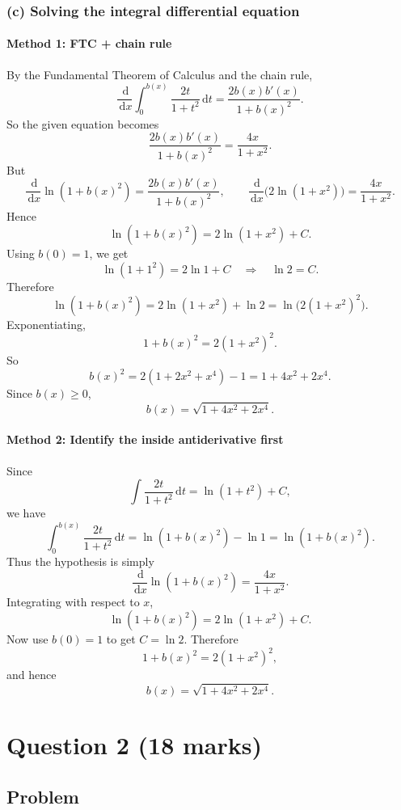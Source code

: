 \documentclass[12pt]{article}
\newcommand{\dd}{\,\mathrm{d}}
\begin{document}
\bigskip

\subsubsection{(c) Solving the integral differential equation}

\paragraph{Method 1: FTC + chain rule}
By the Fundamental Theorem of Calculus and the chain rule,
\[
\frac{\dd}{\dd x}\int_0^{b(x)}\frac{2t}{1+t^2}\dd t
=
\frac{2b(x)b'(x)}{1+b(x)^2}.
\]
So the given equation becomes
\[
\frac{2b(x)b'(x)}{1+b(x)^2}=\frac{4x}{1+x^2}.
\]
But
\[
\frac{\dd}{\dd x}\ln(1+b(x)^2)=\frac{2b(x)b'(x)}{1+b(x)^2},
\qquad
\frac{\dd}{\dd x}\bigl(2\ln(1+x^2)\bigr)=\frac{4x}{1+x^2}.
\]
Hence
\[
\ln(1+b(x)^2)=2\ln(1+x^2)+C.
\]
Using \(b(0)=1\), we get
\[
\ln(1+1^2)=2\ln 1+C \quad\Rightarrow\quad \ln 2=C.
\]
Therefore
\[
\ln(1+b(x)^2)=2\ln(1+x^2)+\ln2
=
\ln\bigl(2(1+x^2)^2\bigr).
\]
Exponentiating,
\[
1+b(x)^2=2(1+x^2)^2.
\]
So
\[
b(x)^2=2(1+2x^2+x^4)-1=1+4x^2+2x^4.
\]
Since \(b(x)\ge 0\),
\[
\boxed{b(x)=\sqrt{1+4x^2+2x^4}.}
\]

\paragraph{Method 2: Identify the inside antiderivative first}
Since
\[
\int \frac{2t}{1+t^2}\dd t=\ln(1+t^2)+C,
\]
we have
\[
\int_0^{b(x)}\frac{2t}{1+t^2}\dd t
=
\ln(1+b(x)^2)-\ln 1
=
\ln(1+b(x)^2).
\]
Thus the hypothesis is simply
\[
\frac{\dd}{\dd x}\ln(1+b(x)^2)=\frac{4x}{1+x^2}.
\]
Integrating with respect to \(x\),
\[
\ln(1+b(x)^2)=2\ln(1+x^2)+C.
\]
Now use \(b(0)=1\) to get \(C=\ln 2\). Therefore
\[
1+b(x)^2=2(1+x^2)^2,
\]
and hence
\[
\boxed{b(x)=\sqrt{1+4x^2+2x^4}.}
\]

\newpage

\section{Question 2 \hfill (18 marks)}

\subsection{Problem}
\end{document}
